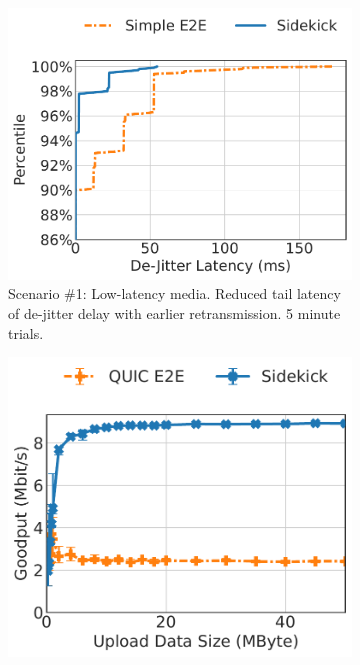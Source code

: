 \begin{figure}
\begin{subfigure}{0.34\textwidth}
\includegraphics[width=\linewidth]{sidekick/figures/fig4a_low_latency_media.pdf}
\caption{Scenario \#1: Low-latency media.
 Reduced tail latency of de-jitter delay
with earlier retransmission. 5 minute trials.}
\label{fig:sidekick:main-results:media}
\end{subfigure}
\hfill
\begin{subfigure}{0.31\textwidth}
\includegraphics[width=0.97\linewidth]{sidekick/figures/fig4b_pep_emulation.pdf}

\end{subfigure}
\end{figure}
